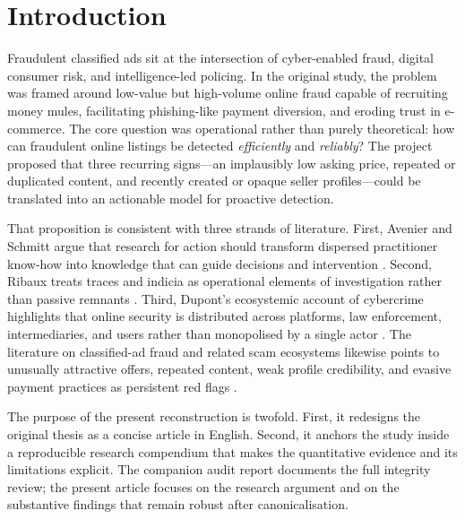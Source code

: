 \documentclass[11pt,a4paper]{article}
\begin{document}
\section{Introduction}
Fraudulent classified ads sit at the intersection of cyber-enabled fraud, digital consumer risk, and intelligence-led policing. In the original study, the problem was framed around low-value but high-volume online fraud capable of recruiting money mules, facilitating phishing-like payment diversion, and eroding trust in e-commerce. The core question was operational rather than purely theoretical: how can fraudulent online listings be detected \emph{efficiently} and \emph{reliably}? The project proposed that three recurring signs---an implausibly low asking price, repeated or duplicated content, and recently created or opaque seller profiles---could be translated into an actionable model for proactive detection.

That proposition is consistent with three strands of literature. First, Avenier and Schmitt argue that research for action should transform dispersed practitioner know-how into knowledge that can guide decisions and intervention \cite{avenier2007}. Second, Ribaux treats traces and indicia as operational elements of investigation rather than passive remnants \cite{ribaux2023}. Third, Dupont's ecosystemic account of cybercrime highlights that online security is distributed across platforms, law enforcement, intermediaries, and users rather than monopolised by a single actor \cite{dupont2024}. The literature on classified-ad fraud and related scam ecosystems likewise points to unusually attractive offers, repeated content, weak profile credibility, and evasive payment practices as persistent red flags \cite{alrousan2020, alzghoul2024, jacquart2021, mokhberi2024}.

The purpose of the present reconstruction is twofold. First, it redesigns the original thesis as a concise article in English. Second, it anchors the study inside a reproducible research compendium that makes the quantitative evidence and its limitations explicit. The companion audit report documents the full integrity review; the present article focuses on the research argument and on the substantive findings that remain robust after canonicalisation.
\end{document}
